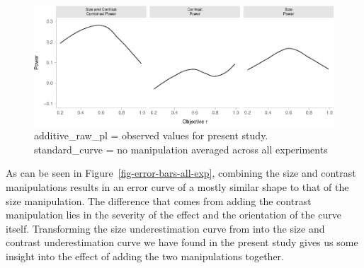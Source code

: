 \documentclass[manuscript, review, anonymous, screen]{acmart}
\begin{document}
\begin{figure}

{\centering \includegraphics[width=1\textwidth,height=\textheight]{size_and_contrast_new_files/figure-pdf/fig-power-plot-1.pdf}

}

\caption{\label{fig-power-plot}additive\_raw\_pl = observed values for
present study. standard\_curve = no manipulation averaged across all
experiments}

\end{figure}

As can be seen in Figure~\ref{fig-error-bars-all-exp}, combining the
size and contrast manipulations results in an error curve of a mostly
similar shape to that of the size manipulation. The difference that
comes from adding the contrast manipulation lies in the severity of the
effect and the orientation of the curve itself. Transforming the size
underestimation curve from \citet{strain_2023} into the size and
contrast underestimation curve we have found in the present study gives
us some insight into the effect of adding the two manipulations
together.




\end{document}
